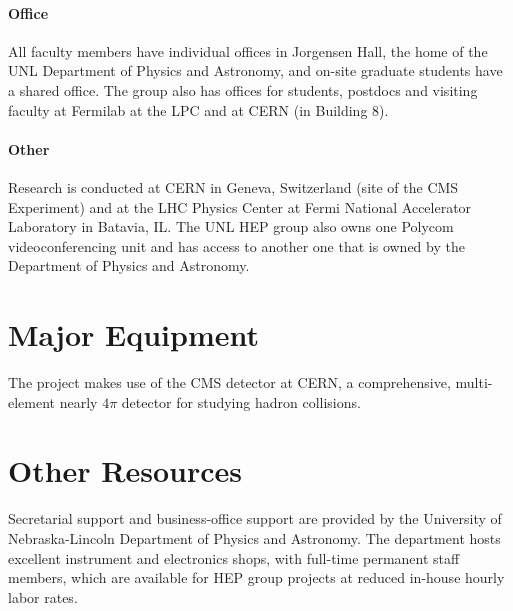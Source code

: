 \documentclass[11pt]{article}
\begin{document}
\paragraph{Office} All faculty members have individual offices in Jorgensen
Hall, the home of the UNL Department of Physics and Astronomy, and on-site
graduate students have a shared office.  The group also has offices for
students, postdocs and visiting faculty at Fermilab at the LPC and at CERN (in Building 8).

\paragraph{Other} Research is conducted at CERN in Geneva, Switzerland
(site of the CMS Experiment) and at the LHC Physics Center at Fermi National Accelerator Laboratory in Batavia, IL. The UNL HEP group also owns one Polycom
videoconferencing unit and has access to another one that is owned by the
Department of Physics and Astronomy.

\section{Major Equipment}

The project makes use of the CMS detector at CERN, a comprehensive,
multi-element nearly $4\pi$ detector for studying hadron collisions.  

\section{Other Resources}

Secretarial support and business-office support are provided by the
University of Nebraska-Lincoln Department of Physics and Astronomy. The department hosts excellent instrument and electronics shops, with full-time permanent staff members, which are available for HEP group projects at reduced in-house hourly labor rates.
\end{document}
